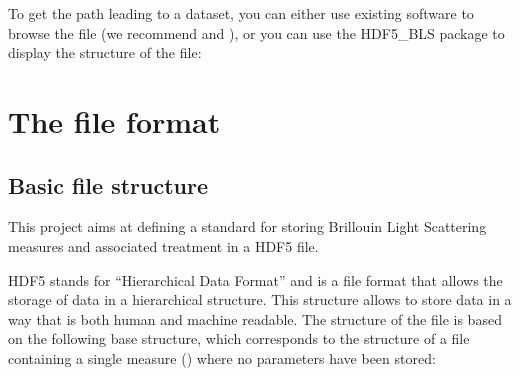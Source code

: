 \documentclass[letterpaper,10pt,english]{sphinxmanual}
\begin{document}
\begin{sphinxVerbatim}[commandchars=\\\{\}]

    

  \PYG{p}{[}\PYG{p}{]}
\end{sphinxVerbatim}

\sphinxAtStartPar
To get the path leading to a dataset, you can either use existing software to browse the file (we recommend  and ), or you can use the HDF5\_BLS package to display the structure of the file:

\begin{sphinxVerbatim}[commandchars=\\\{\}]
\end{sphinxVerbatim}

\sphinxstepscope


\section{The file format}
\label{\detokenize{source/file_format:the-file-format}}\label{\detokenize{source/file_format::doc}}

\subsection{Basic file structure}
\label{\detokenize{source/file_format:basic-file-structure}}
\sphinxAtStartPar
This project aims at defining a standard for storing Brillouin Light Scattering measures and associated treatment in a HDF5 file.

\sphinxAtStartPar
HDF5 stands for “Hierarchical Data Format” and is a file format that allows the storage of data in a hierarchical structure. This structure allows to store data in a way that is both human and machine readable. The structure of the file is based on the following base structure, which corresponds to the structure of a file containing a single measure () where no parameters have been stored:
\end{document}
